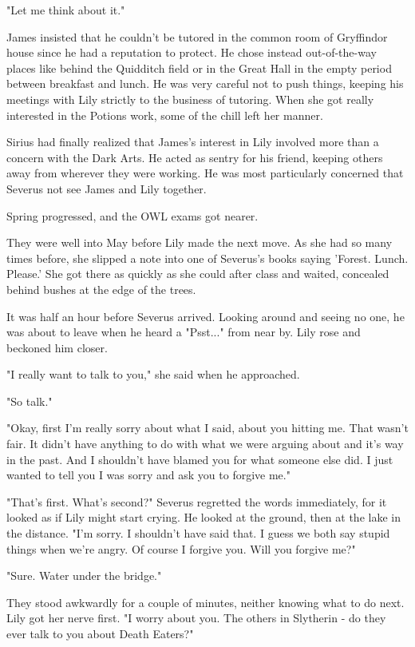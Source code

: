 \documentclass[a4paper,11pt]{article}
\begin{document}
"Let me think about it."

James insisted that he couldn't be tutored in the common room of Gryffindor house since he had a reputation to protect. He chose instead out-of-the-way places like behind the Quidditch field or in the Great Hall in the empty period between breakfast and lunch. He was very careful not to push things, keeping his meetings with Lily strictly to the business of tutoring. When she got really interested in the Potions work, some of the chill left her manner.

Sirius had finally realized that James's interest in Lily involved more than a concern with the Dark Arts. He acted as sentry for his friend, keeping others away from wherever they were working. He was most particularly concerned that Severus not see James and Lily together.

Spring progressed, and the OWL exams got nearer.

They were well into May before Lily made the next move. As she had so many times before, she slipped a note into one of Severus's books saying 'Forest. Lunch. Please.' She got there as quickly as she could after class and waited, concealed behind bushes at the edge of the trees.

It was half an hour before Severus arrived. Looking around and seeing no one, he was about to leave when he heard a "Psst..." from near by. Lily rose and beckoned him closer.

"I really want to talk to you," she said when he approached.

"So talk."

"Okay, first I'm really sorry about what I said, about you hitting me. That wasn't fair. It didn't have anything to do with what we were arguing about and it's way in the past. And I shouldn't have blamed you for what someone else did. I just wanted to tell you I was sorry and ask you to forgive me."

"That's first. What's second?" Severus regretted the words immediately, for it looked as if Lily might start crying. He looked at the ground, then at the lake in the distance. "I'm sorry. I shouldn't have said that. I guess we both say stupid things when we're angry. Of course I forgive you. Will you forgive me?"

"Sure. Water under the bridge."

They stood awkwardly for a couple of minutes, neither knowing what to do next. Lily got her nerve first. "I worry about you. The others in Slytherin - do they ever talk to you about Death Eaters?"
\end{document}
